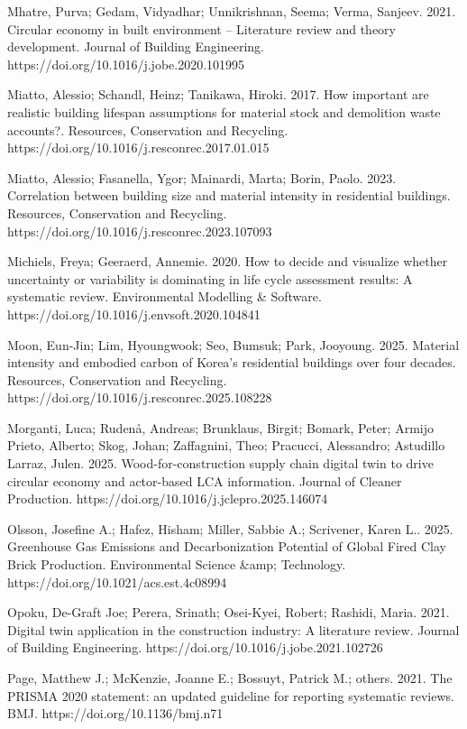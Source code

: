 Mhatre, Purva; Gedam, Vidyadhar; Unnikrishnan, Seema; Verma, Sanjeev. 2021. Circular economy in built environment -- Literature review and theory development. Journal of Building Engineering. https://doi.org/10.1016/j.jobe.2020.101995

Miatto, Alessio; Schandl, Heinz; Tanikawa, Hiroki. 2017. How important are realistic building lifespan assumptions for material stock and demolition waste accounts?. Resources, Conservation and Recycling. https://doi.org/10.1016/j.resconrec.2017.01.015

Miatto, Alessio; Fasanella, Ygor; Mainardi, Marta; Borin, Paolo. 2023. Correlation between building size and material intensity in residential buildings. Resources, Conservation and Recycling. https://doi.org/10.1016/j.resconrec.2023.107093

Michiels, Freya; Geeraerd, Annemie. 2020. How to decide and visualize whether uncertainty or variability is dominating in life cycle assessment results: A systematic review. Environmental Modelling \& Software. https://doi.org/10.1016/j.envsoft.2020.104841

Moon, Eun-Jin; Lim, Hyoungwook; Seo, Bumsuk; Park, Jooyoung. 2025. Material intensity and embodied carbon of Korea's residential buildings over four decades. Resources, Conservation and Recycling. https://doi.org/10.1016/j.resconrec.2025.108228

Morganti, Luca; Rudenå, Andreas; Brunklaus, Birgit; Bomark, Peter; Armijo Prieto, Alberto; Skog, Johan; Zaffagnini, Theo; Pracucci, Alessandro; Astudillo Larraz, Julen. 2025. Wood-for-construction supply chain digital twin to drive circular economy and actor-based LCA information. Journal of Cleaner Production. https://doi.org/10.1016/j.jclepro.2025.146074

Olsson, Josefine A.; Hafez, Hisham; Miller, Sabbie A.; Scrivener, Karen L.. 2025. Greenhouse Gas Emissions and Decarbonization Potential of Global Fired Clay Brick Production. Environmental Science \&amp; Technology. https://doi.org/10.1021/acs.est.4c08994

Opoku, De-Graft Joe; Perera, Srinath; Osei-Kyei, Robert; Rashidi, Maria. 2021. Digital twin application in the construction industry: A literature review. Journal of Building Engineering. https://doi.org/10.1016/j.jobe.2021.102726

Page, Matthew J.; McKenzie, Joanne E.; Bossuyt, Patrick M.; others. 2021. The PRISMA 2020 statement: an updated guideline for reporting systematic reviews. BMJ. https://doi.org/10.1136/bmj.n71

